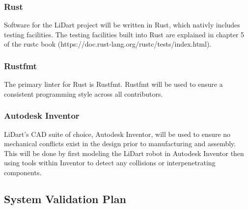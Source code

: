 \documentclass[12pt, titlepage]{article}
\begin{document}

\subsubsection{Rust}
Software for the LiDart project will be written in Rust, which nativly includes testing facilities.
The testing facilities built into Rust are explained in chapter 5 of the
rustc book (https://doc.rust-lang.org/rustc/tests/index.html).

\subsubsection{Rustfmt}
The primary linter for Rust is Rustfmt. Rustfmt will be used to ensure a consistent
programming style across all contributors.

\subsubsection{Autodesk Inventor}
LiDart's CAD suite of choice, Autodesk Inventor, will be used to ensure no mechanical conflicts
exist in the design prior to manufacturing and assembly. This will be done by first modeling the LiDart
robot in Autodesk Inventor then using tools within Inventor to detect any
collisions or interpenetrating components.

\subsection{System Validation Plan}




\end{document}
